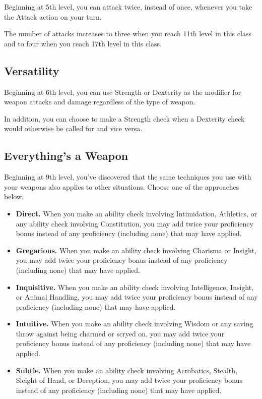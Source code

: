 Beginning at 5th level, you can attack twice, instead of once, whenever you take the Attack action on your turn.

The number of attacks increases to three when you reach 11th level in this class and to four when you reach 17th level in this class.

\subsection{Versatility}
Beginning at 6th level, you can use Strength or Dexterity as the modifier for weapon attacks and damage regardless of the type of weapon.

In addition, you can choose to make a Strength check when a Dexterity check would otherwise be called for and vice versa.

\subsection{Everything's a Weapon}
Beginning at 9th level, you've discovered that the same techniques you use with your weapons also applies to other situations. Choose one of the approaches below.

\begin{itemize}
	\item \textbf{Direct.} When you make an ability check involving Intimidation, Athletics, or any ability check involving Constitution, you may add twice your proficiency bonus instead of any proficiency (including none) that may have applied.
	\item \textbf{Gregarious.} When you make an ability check involving Charisma or Insight, you may add twice your proficiency bonus instead of any proficiency (including none) that may have applied.
	\item \textbf{Inquisitive.} When you make an ability check involving Intelligence, Insight, or Animal Handling, you may add twice your proficiency bonus instead of any proficiency (including none) that may have applied.
	\item \textbf{Intuitive.} When you make an ability check involving Wisdom or any saving throw against being charmed or scryed on, you may add twice your proficiency bonus instead of any proficiency (including none) that may have applied.
	\item \textbf{Subtle.} When you make an ability check involving Acrobatics, Stealth, Sleight of Hand, or Deception, you may add twice your proficiency bonus instead of any proficiency (including none) that may have applied.
\end{itemize}

